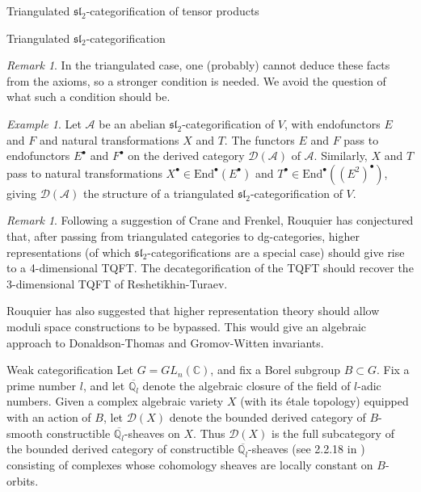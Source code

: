 \documentclass[12pt]{amsart}
\theoremstyle{definition}
\theoremstyle{remark}
\newtheorem{rmk}[thm]{Remark}
\theoremstyle{remark}
\newtheorem{ex}[thm]{Example}
\begin{document}
\begin{section}{Triangulated $\mathfrak{sl}_{2}$-categorification of tensor products}
\begin{subsection}{Triangulated $\mathfrak{sl}_{2}$-categorification}
\begin{rmk}
In the triangulated case, one (probably) cannot deduce these facts from the axioms, so a stronger condition is needed. We avoid the question of what such a condition should be.    
\end{rmk}  

\begin{ex} Let $\mathcal{A}$ be an abelian $\mathfrak{sl}_{2}$-categorification of $V$, with endofunctors $E$ and $F$ and natural transformations $X$ and $T$. The functors $E$ and $F$  pass to endofunctors $E^{\bullet}$ and $F^{\bullet}$ on the derived category $\mathcal{D}(\mathcal{A})$ of $\mathcal{A}$. Similarly, $X$ and $T$ pass to natural transformations $X^{\bullet} \in \text{End}^{\bullet}(E^{\bullet})$ and $T^{\bullet} \in \text{End}^{\bullet}((E^{2})^{\bullet})$, giving $\mathcal{D}(\mathcal{A})$ the structure of a triangulated $\mathfrak{sl}_{2}$-categorification of $V$.  \end{ex}

\begin{rmk} \label{TQFTRmks} Following a suggestion of Crane and Frenkel, Rouquier has conjectured that, after passing from triangulated categories to dg-categories, higher representations (of which $\mathfrak{sl}_{2}$-categorifications are a special case) should give rise to a 4-dimensional TQFT. The decategorification of the TQFT should recover the 3-dimensional TQFT of Reshetikhin-Turaev. 

Rouquier has also suggested that higher representation theory should allow moduli space constructions to be bypassed. This would give an algebraic approach to Donaldson-Thomas and Gromov-Witten invariants. 
\end{rmk}

\end{subsection}

\begin{subsection}{Weak categorification} Let $G = GL_{n}(\mathbb{C})$, and fix a Borel subgroup $B \subset G$. Fix a prime number $l$, and let $\overline{\mathbb{Q}_{l}}$ denote the algebraic closure of the field of $l$-adic numbers. Given a complex algebraic variety $X$ (with its \'etale topology) equipped with an action of $B$, let $\mathcal{D}(X)$ denote the bounded derived category of $B$-smooth constructible $\overline{\mathbb{Q}_{l}}$-sheaves on $X$. Thus $\mathcal{D}(X)$ is the full subcategory of the bounded derived category of constructible $\overline{\mathbb{Q}_{l}}$-sheaves (see 2.2.18 in \cite{BeilinsonBernsteinDeligneFaisceauxPervers}) consisting of complexes whose cohomology sheaves are locally constant on $B$-orbits. 


\end{subsection}
\end{section}
\end{document}
